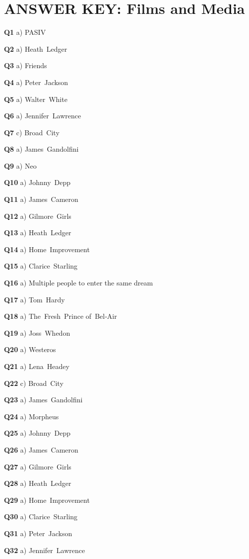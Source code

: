 \section{ANSWER KEY: Films and Media}

\textbf{Q1} a) PASIV\par
\textbf{Q2} a) Heath Ledger\par
\textbf{Q3} a) Friends\par
\textbf{Q4} a) Peter Jackson\par
\textbf{Q5} a) Walter White\par
\textbf{Q6} a) Jennifer Lawrence\par
\textbf{Q7} c) Broad City\par
\textbf{Q8} a) James Gandolfini\par
\textbf{Q9} a) Neo\par
\textbf{Q10} a) Johnny Depp\par
\textbf{Q11} a) James Cameron\par
\textbf{Q12} a) Gilmore Girls\par
\textbf{Q13} a) Heath Ledger\par
\textbf{Q14} a) Home Improvement\par
\textbf{Q15} a) Clarice Starling\par
\textbf{Q16} a) Multiple people to enter the same dream\par
\textbf{Q17} a) Tom Hardy\par
\textbf{Q18} a) The Fresh Prince of Bel‑Air\par
\textbf{Q19} a) Joss Whedon\par
\textbf{Q20} a) Westeros\par
\textbf{Q21} a) Lena Headey\par
\textbf{Q22} c) Broad City\par
\textbf{Q23} a) James Gandolfini\par
\textbf{Q24} a) Morpheus\par
\textbf{Q25} a) Johnny Depp\par
\textbf{Q26} a) James Cameron\par
\textbf{Q27} a) Gilmore Girls\par
\textbf{Q28} a) Heath Ledger\par
\textbf{Q29} a) Home Improvement\par
\textbf{Q30} a) Clarice Starling\par
\textbf{Q31} a) Peter Jackson\par
\textbf{Q32} a) Jennifer Lawrence\par
